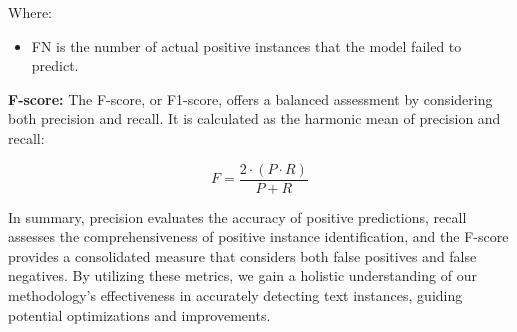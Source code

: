Where: \\
\begin{itemize}
    \item FN is the number of actual positive instances that the model failed to predict. \\
\end{itemize}

\textbf{F-score:} The F-score, or F1-score, offers a balanced assessment by considering both precision and recall. It is calculated as the harmonic mean of precision and recall:

\begin{equation}
F = \frac{2 \cdot (P \cdot R)}{P + R}
\end{equation}

In summary, precision evaluates the accuracy of positive predictions, recall assesses the comprehensiveness of positive instance identification, and the F-score provides a consolidated measure that considers both false positives and false negatives. By utilizing these metrics, we gain a holistic understanding of our methodology's effectiveness in accurately detecting text instances, guiding potential optimizations and improvements.




